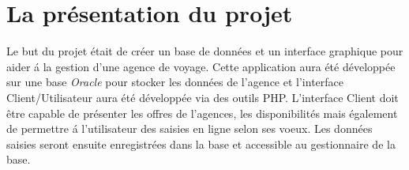 \section{La pr\'esentation du projet}
Le but du projet \'etait de cr\'eer un base de donn\'ees et un interface graphique pour aider \'a la gestion d'une agence de voyage. Cette application aura \'et\'e d\'evelopp\'ee sur une base \textit{Oracle} pour stocker les donn\'ees de l'agence et l'interface Client/Utilisateur aura \'et\'e d\'evelopp\'ee via des outils PHP. L'interface Client doit \^etre capable de pr\'esenter les offres de l'agences, les disponibilit\'es mais \'egalement de permettre \'a l'utilisateur des saisies en ligne selon ses voeux. Les donn\'ees saisies seront ensuite enregistr\'ees dans la base et accessible au gestionnaire de la base.

\newpage